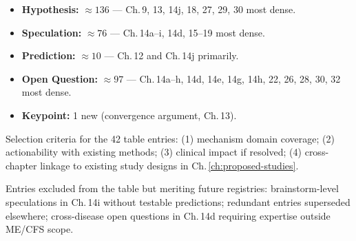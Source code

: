 \begin{itemize}
  \item \textbf{Hypothesis:} $\approx 136$ --- Ch.\,9, 13, 14j, 18, 27, 29, 30 most dense.
  \item \textbf{Speculation:} $\approx 76$ --- Ch.\,14a--i, 14d, 15--19 most dense.
  \item \textbf{Prediction:} $\approx 10$ --- Ch.\,12 and Ch.\,14j primarily.
  \item \textbf{Open Question:} $\approx 97$ --- Ch.\,14a--h, 14d, 14e, 14g, 14h, 22, 26, 28, 30, 32 most dense.
  \item \textbf{Keypoint:} 1 new (convergence argument, Ch.\,13).
\end{itemize}

Selection criteria for the 42 table entries: (1) mechanism domain coverage;
(2) actionability with existing methods; (3) clinical impact if resolved;
(4) cross-chapter linkage to existing study designs in Ch.\,\ref{ch:proposed-studies}.

Entries excluded from the table but meriting future registries:
brainstorm-level speculations in Ch.\,14i without testable predictions;
redundant entries superseded elsewhere; cross-disease open questions in Ch.\,14d
requiring expertise outside ME/CFS scope.
